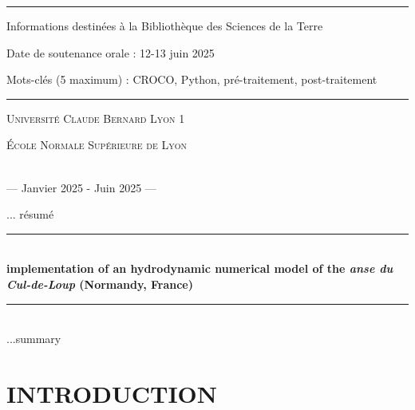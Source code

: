 \documentclass[10pt,a4paper,titlepage]{article}
\newcommand{\HRule}{\rule{\linewidth}{0.5mm}}
\begin{document}
\begin{titlepage}
\begin{sffamily}
\begin{center}
\HRule \vspace{0.2cm}
Informations destinées à la Bibliothèque des Sciences de la Terre

Date de soutenance orale : 12-13 juin 2025

Mots-clés (5 maximum) : CROCO, Python, pré-traitement, post-traitement
\HRule \vspace{0.2cm}
                \begin{minipage}{0.45\textwidth}
                    \begin{flushleft}
                        \textsc{Université Claude Bernard Lyon 1}
                    \end{flushleft}
                \end{minipage}
                \begin{minipage}{0.45\textwidth}
                    \begin{flushright}
                        \textsc{École Normale Supérieure de Lyon}
                    \end{flushright}
                \end{minipage}
                \\
                \vspace{0.4cm}
                {\large— Janvier 2025 - Juin 2025 —}

            \end{center}
        \end{sffamily}
    \end{titlepage}
\newpage


... résumé

\HRule \\[0.4cm]
{ \huge \bfseries implementation of an hydrodynamic numerical model of the \textit{anse du Cul-de-Loup} (Normandy, France)\\ [0.2cm] }
\HRule \\[2cm]

...summary

\newpage

    \tableofcontents
    \newpage

    \section{INTRODUCTION}
    \label{sec:introduction}

\end{document}
